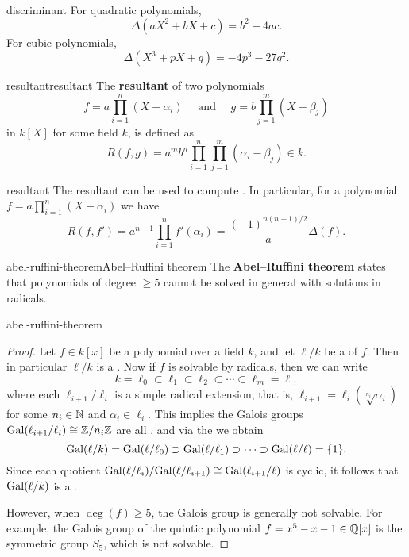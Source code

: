 \begin{example}{discriminant}
    For quadratic polynomials,
    \[ \Delta(aX^2 + bX + c) = b^2 - 4ac . \]
    For cubic polynomials,
    \[ \Delta(X^3 + pX + q) = -4p^3 - 27q^2 . \]
\end{example}

\begin{topic}{resultant}{resultant}
    The \textbf{resultant} of two polynomials
    \[ f = a \prod_{i = 1}^{n} (X - \alpha_i) \quad \text{ and } \quad g = b \prod_{j = 1}^{m} (X - \beta_j) \]
    in $k[X]$ for some field $k$, is defined as
    \[ R(f, g) = a^m b^n \prod_{i = 1}^{n} \prod_{j = 1}^{m} (\alpha_i - \beta_j) \in k . \]
\end{topic}

\begin{example}{resultant}
    The resultant can be used to compute . In particular, for a polynomial $f = a \prod_{i = 1}^{n} (X - \alpha_i)$ we have
    \[ R(f, f') = a^{n - 1} \prod_{i = 1}^{n} f'(\alpha_i) = \frac{(-1)^{n(n - 1)/2}}{a} \Delta(f) . \]
\end{example}

\begin{topic}{abel-ruffini-theorem}{Abel--Ruffini theorem}
    The \textbf{Abel--Ruffini theorem} states that polynomials of degree $\ge 5$ cannot be solved in general with solutions in radicals.
\end{topic}

\begin{example}{abel-ruffini-theorem}
    \begin{proof}
        Let $f \in k[x]$ be a polynomial over a field $k$, and let $\ell/k$ be a  of $f$. Then in particular $\ell/k$ is a . Now if $f$ is solvable by radicals, then we can write
        \[ k = \ell_0 \subset \ell_1 \subset \ell_2 \subset \cdots \subset \ell_m = \ell , \]
        where each $\ell_{i + 1}/\ell_i$ is a simple radical extension, that is, $\ell_{i + 1} = \ell_i(\sqrt[n_i]{\alpha_i})$ for some $n_i \in \mathbb{N}$ and $\alpha_i \in \ell_i$. This implies the Galois groups $\textup{Gal}(\ell_{i + 1}/\ell_i) \cong \mathbb{Z}/n_i\mathbb{Z}$ are all , and via the  we obtain
        \[ \textup{Gal}(\ell/k) = \textup{Gal}(\ell/\ell_0) \supset \textup{Gal}(\ell/\ell_1) \supset \cdots \supset \textup{Gal}(\ell/\ell) = \{ 1 \} . \]
        Since each quotient $\textup{Gal}(\ell/\ell_i) / \textup{Gal}(\ell/\ell_{i + 1}) \cong \textup{Gal}(\ell_{i + 1}/\ell)$ is cyclic, it follows that $\textup{Gal}(\ell/k)$ is a .
        
        However, when $\deg(f) \ge 5$, the Galois group is generally not solvable. For example, the Galois group of the quintic polynomial $f = x^5 - x - 1 \in \mathbb{Q}[x]$ is the symmetric group $S_5$, which is not solvable.
    \end{proof}
\end{example}
